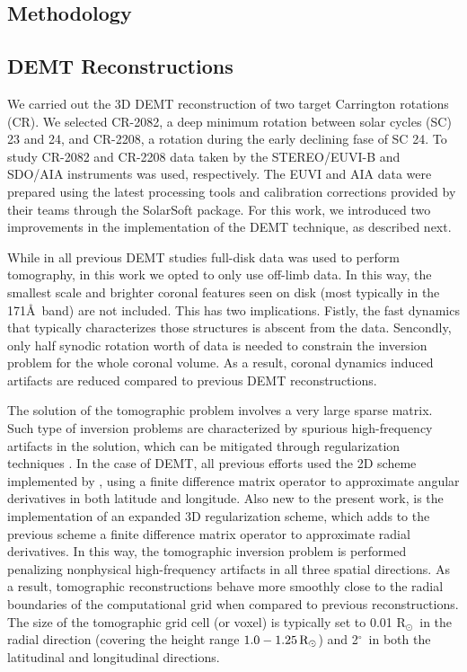 \documentclass[namedreferences]{solarphysics}
\renewcommand{\deg}{$^\circ$}
\newcommand{\rsun}{R{$_\odot$}}
\newcommand{\mrsun}{{\rm R_\odot}}
\begin{document}
\begin{article}
\section{Methodology}\label{meto}   

\subsection{{DEMT Reconstructions}}\label{demt}

{We carried out the 3D DEMT reconstruction of two target Carrington rotations (CR). We selected CR-2082, a deep minimum rotation between solar cycles (SC) 23 and 24, and CR-2208, a rotation during the early declining fase of SC 24. To study CR-2082 and CR-2208 data taken by the STEREO/EUVI-B and SDO/AIA instruments was used, respectively. The EUVI and AIA data were prepared using the latest processing tools and calibration corrections provided by their teams through the SolarSoft package. For this work, we introduced two improvements in the implementation of the DEMT technique, as described next.}

{While in all previous DEMT studies full-disk data was used to perform tomography, in this work we opted to only use off-limb data. In this way, the smallest scale and brighter coronal features seen on disk (most typically in the 171\AA\ band) are not included. This has two implications. Fistly, the fast dynamics that typically characterizes those structures is abscent from the data. Sencondly, only half synodic rotation worth of data is needed to constrain the inversion problem for the whole coronal volume. As a result, coronal dynamics induced artifacts are reduced compared to previous DEMT reconstructions.}

{The solution of the tomographic problem involves a very large sparse matrix. Such type of inversion problems are characterized by spurious high-frequency artifacts in the solution, which can be mitigated through {regularization} techniques \citep{frazin_2000}. In the case of DEMT, all previous efforts used the 2D scheme implemented by \citet{frazin_2009}, using a finite difference matrix operator to approximate angular derivatives in both latitude and longitude. Also new to the present work, is the implementation of an expanded 3D regularization scheme, which adds to the previous scheme a finite difference matrix operator to approximate radial derivatives. In this way, the tomographic inversion problem is performed penalizing nonphysical high-frequency artifacts in all three spatial directions. As a result, tomographic reconstructions behave more smoothly close to the radial boundaries of the computational grid when compared to previous reconstructions.}
{The size of the tomographic grid cell (or voxel) is typically set to 0.01 \rsun \ in the radial direction (covering the height range $1.0-1.25\,\mrsun$) and 2\deg\ in both the latitudinal and longitudinal directions. }


\end{article}
\end{document}
